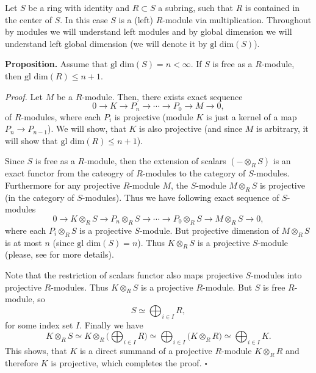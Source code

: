 \documentclass[12pt]{article}
\begin{document}
Let $S$ be a ring with identity and $R\subset S$ a subring, such that $R$ is contained in the center of $S$. In this case $S$ is a (left) $R$-module via multiplication. Throughout by modules we will understand left modules and by global dimension we will understand left global dimension (we will denote it by $\mbox{gl dim}(S)$).

\textbf{Proposition.} Assume that $\mbox{gl dim}(S)=n<\infty$. If $S$ is free as a $R$-module, then $\mbox{gl dim}(R)\leq n+1$.

\textit{Proof.} Let $M$ be a $R$-module. Then, there exists exact sequence
$$0\rightarrow K\rightarrow P_n\rightarrow\cdots\rightarrow P_0\rightarrow M\rightarrow 0,$$
of $R$-modules, where each $P_i$ is projective (module $K$ is just a kernel of a map $P_n\to P_{n-1}$). We will show, that $K$ is also projective (and since $M$ is arbitrary, it will show that $\mbox{gl dim}(R)\leq n+1$).

Since $S$ is free as a $R$-module, then the extension of scalars $(-\otimes_{R} S)$ is an exact functor from the cateogry of $R$-modules to the category of $S$-modules. Furthermore for any projective $R$-module $M$, the $S$-module $M\otimes_{R} S$ is projective (in the category of $S$-modules). Thus we have following exact sequence of $S$-modules
$$0\rightarrow K\otimes_{R} S\rightarrow P_n\otimes_{R} S\rightarrow\cdots\rightarrow P_0\otimes_{R} S\rightarrow M\otimes_{R} S\rightarrow 0,$$
where each $P_i\otimes_{R} S$ is a projective $S$-module. But projective dimension of $M\otimes_{R} S$ is at most $n$ (since $\mbox{gl dim}(S)=n$). Thus $K\otimes_{R} S$ is a projective $S$-module (please, see  for more details).

Note that the restriction of scalars functor also maps projective $S$-modules into projective $R$-modules. Thus $K\otimes_{R} S$ is a projective $R$-module. But $S$ is free $R$-module, so 
$$S\simeq \bigoplus_{i\in I} R,$$
for some index set $I$. Finally we have
$$K\otimes_{R} S\simeq K\otimes_{R} \big(\bigoplus_{i\in I} R\big)\simeq \bigoplus_{i\in I} \big(K\otimes_{R}R\big)\simeq \bigoplus_{i\in I} K.$$
This shows, that $K$ is a direct summand of a projective $R$-module $K\otimes_{R} R$ and therefore $K$ is projective, which completes the proof. $\square$
\end{document}
